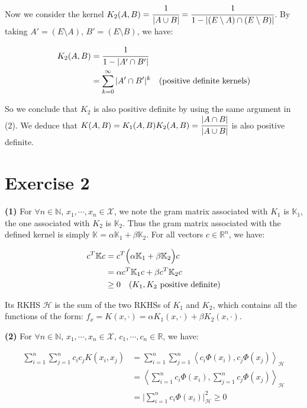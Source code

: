 \documentclass[11pt]{article}
\begin{document}
    Now we consider the kernel $K_2 (A, B) = \cfrac{1}{|A \cup B|} = \cfrac{1}{1 - |(E \setminus A) \cap (E \setminus B)|}$.
    By taking $A' = (E \setminus A)$, $B' = (E \setminus B)$, we have:

    \vspace{-4em}
    \begin{align*}
      K_2(A, B) &= \cfrac{1}{1 - |A' \cap B'|} \\
      &= \sum_{k=0}^\infty |A' \cap B'|^k \mbox{\quad (positive definite kernels)}
    \end{align*}
    \vspace{-4em} 

    So we conclude that $K_2$ is also positive definite by using the same argument in (2). 
    We deduce that $K(A, B) = K_1(A, B) K_2(A, B) = \cfrac{|A \cap B|}{|A \cup B|}$ is also positive definite.


    \section*{Exercise 2}

    \textbf{(1)} For $\forall n \in \mathbb{N}$, $x_1, \cdots, x_n \in \mathcal{X}$, we note the gram matrix associated with $K_1$ is $\mathbb{K}_1$, the one associated with $K_2$ is $\mathbb{K}_2$. 
    Thus the gram matrix associated with the defined kernel is simply $\mathbb{K} = \alpha \mathbb{K}_1 + \beta \mathbb{K}_2 $.
    For all vectors $c \in \mathbb{R}^n$, we have:

    \vspace{-4em}
    \begin{align*}
      c^T \mathbb{K} c &= c^T \Big (\alpha \mathbb{K}_1 + \beta \mathbb{K}_2 \Big ) c \\
      &= \alpha c^T \mathbb{K}_1 c + \beta c^T \mathbb{K}_2 c \\
      &\ge 0 \mbox{\quad } (K_1, K_2 \mbox{ positive definite}) 
    \end{align*}
    \vspace{-4em}

    Its RKHS $\mathcal{H}$ is the sum of the two RKHSs of $K_1$ and $K_2$, which contains all the functions of the form:
    $f_x = K(x, \cdot) = \alpha K_1 (x, \cdot) + \beta K_2 (x, \cdot)$.

    \textbf{(2)} For $\forall n \in \mathbb{N}$, $x_1, \cdots, x_n \in \mathcal{X}$, $c_1, \cdots, c_n \in \mathbb{R}$, we have:

    \vspace{-4em}
    \begin{align*}
      \sum_{i=1}^n \sum_{j=1}^n c_i c_j K(x_i, x_j) &= \sum_{i=1}^n \sum_{j=1}^n  \left \langle c_i \Phi(x_i), c_j \Phi(x_j) \right \rangle_{\mathcal{H}} \\
      &= \left \langle \sum_{i=1}^n c_i \Phi (x_i), \sum_{j=1}^n c_j \Phi (x_j) \right \rangle_{\mathcal{H}} \\
      &= \Big | \sum_{i=1}^n c_i \Phi (x_i) \Big |_\mathcal{H}^2 \ge 0
    \end{align*}
    \vspace{-4em}
\end{document}
